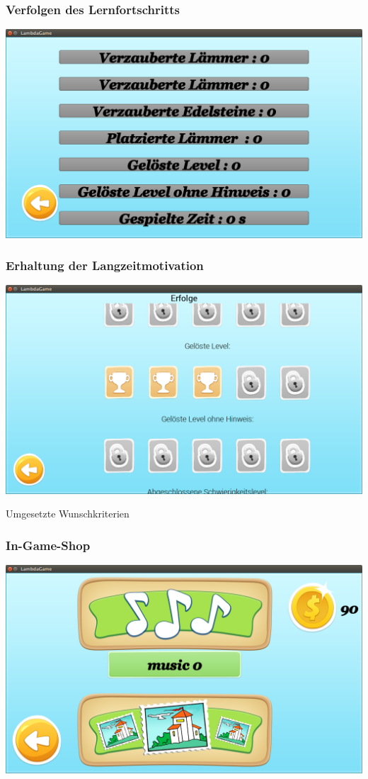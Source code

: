 \documentclass[18pt]{beamer}
\begin{document}
\begin{frame}
	\frametitle{Verfolgen des Lernfortschritts}
	\includegraphics[width=\textwidth]{pictures/statisticmenu}
\end{frame}

\begin{frame}
	\frametitle{Erhaltung der Langzeitmotivation}
	\includegraphics[width=\textwidth]{pictures/achievementvs}
\end{frame}

\begin{frame}[c]
	\begin{center}
	\Huge
	Umgesetzte Wunschkriterien
	\end{center}
\end{frame}

\begin{frame}
	\frametitle{In-Game-Shop}
	\includegraphics[width=\textwidth]{pictures/shop}
\end{frame}
\end{document}
